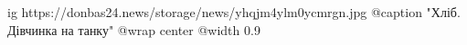  
 
 
 
 

\ifcmt
  ig https://donbas24.news/storage/news/yhqjm4ylm0ycmrgn.jpg
	@caption "Хліб. Дівчинка на танку"
  @wrap center
  @width 0.9
\fi
